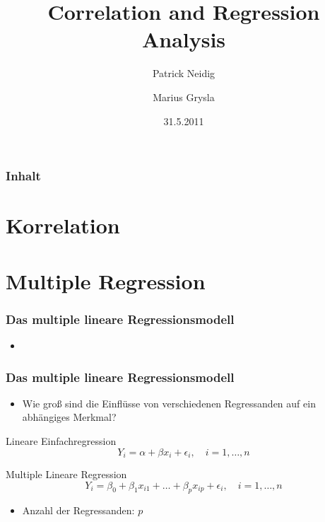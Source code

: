 \documentclass{beamer}
\begin{document}
\title{Correlation and Regression Analysis}
\author{Patrick Neidig \and Marius Grysla}
\date{31.5.2011}
\frame{\titlepage}

\begin{frame}
 \frametitle{Inhalt}
 \tableofcontents
\end{frame}

\section{Korrelation}
\begin{frame}
 
\end{frame}


\section{Multiple Regression}
\begin{frame}
 \frametitle{Das multiple lineare Regressionsmodell}
 \begin{itemize}
 \item 
 \end{itemize}
\end{frame}


\begin{frame}
 \frametitle{Das multiple lineare Regressionsmodell}

 \begin{itemize}
  \item Wie groß sind die Einflüsse von verschiedenen Regressanden auf ein abhängiges Merkmal?
 \end{itemize}
 
 \begin{block}{Lineare Einfachregression}
  \begin{equation*}
   Y_i = \alpha + \beta x_i + \epsilon_i, \quad i = 1, \dots, n
  \end{equation*}
 \end{block}

 \begin{block}{Multiple Lineare Regression}
  \begin{equation*}
   Y_i = \beta_0 + \beta_1 x_{i1} + \dots + \beta_p x_{ip} + \epsilon_i, \quad i = 1, \dots, n
  \end{equation*}
  \begin{itemize}
   \item Anzahl der Regressanden: $p$
  \end{itemize}

 \end{block}

\end{frame}
\end{document}
